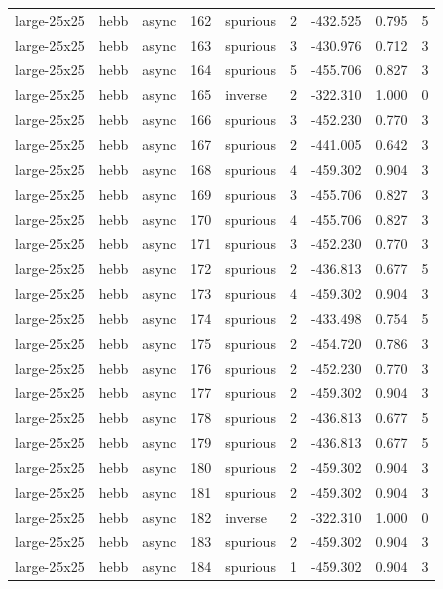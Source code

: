 \begin{tabular}{lllrlrrrr}
large-25x25 & hebb & async & 162 & spurious & 2 & -432.525 & 0.795 & 5 \\
large-25x25 & hebb & async & 163 & spurious & 3 & -430.976 & 0.712 & 3 \\
large-25x25 & hebb & async & 164 & spurious & 5 & -455.706 & 0.827 & 3 \\
large-25x25 & hebb & async & 165 & inverse & 2 & -322.310 & 1.000 & 0 \\
large-25x25 & hebb & async & 166 & spurious & 3 & -452.230 & 0.770 & 3 \\
large-25x25 & hebb & async & 167 & spurious & 2 & -441.005 & 0.642 & 3 \\
large-25x25 & hebb & async & 168 & spurious & 4 & -459.302 & 0.904 & 3 \\
large-25x25 & hebb & async & 169 & spurious & 3 & -455.706 & 0.827 & 3 \\
large-25x25 & hebb & async & 170 & spurious & 4 & -455.706 & 0.827 & 3 \\
large-25x25 & hebb & async & 171 & spurious & 3 & -452.230 & 0.770 & 3 \\
large-25x25 & hebb & async & 172 & spurious & 2 & -436.813 & 0.677 & 5 \\
large-25x25 & hebb & async & 173 & spurious & 4 & -459.302 & 0.904 & 3 \\
large-25x25 & hebb & async & 174 & spurious & 2 & -433.498 & 0.754 & 5 \\
large-25x25 & hebb & async & 175 & spurious & 2 & -454.720 & 0.786 & 3 \\
large-25x25 & hebb & async & 176 & spurious & 2 & -452.230 & 0.770 & 3 \\
large-25x25 & hebb & async & 177 & spurious & 2 & -459.302 & 0.904 & 3 \\
large-25x25 & hebb & async & 178 & spurious & 2 & -436.813 & 0.677 & 5 \\
large-25x25 & hebb & async & 179 & spurious & 2 & -436.813 & 0.677 & 5 \\
large-25x25 & hebb & async & 180 & spurious & 2 & -459.302 & 0.904 & 3 \\
large-25x25 & hebb & async & 181 & spurious & 2 & -459.302 & 0.904 & 3 \\
large-25x25 & hebb & async & 182 & inverse & 2 & -322.310 & 1.000 & 0 \\
large-25x25 & hebb & async & 183 & spurious & 2 & -459.302 & 0.904 & 3 \\
large-25x25 & hebb & async & 184 & spurious & 1 & -459.302 & 0.904 & 3 \\

\end{tabular}
